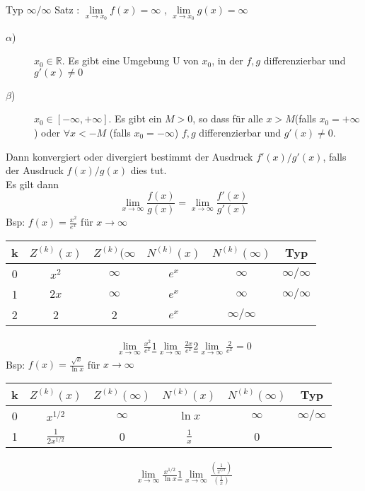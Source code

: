 \documentclass{article}
\begin{document}
Typ \(\infty / \infty\) \medskip
Satz :  \(\lim\limits_{x \to x_0} f(x) = \infty\) , \(\lim\limits_{x \to x_0} g(x) = \infty\)\medskip
\begin{description}
\item[\(\alpha\))]
\(x_0 \in \mathbb{R}\). Es gibt eine Umgebung U von \(x_0\), in der \(f,g\) differenzierbar und \(g'(x) \neq 0\)\medskip
\item[\(\beta\))]
\(x_0 \in [-\infty, +\infty]\). Es gibt ein \(M > 0\), so dass für alle \(x > M\)(falls \(x_0 = +\infty\)) oder \(\forall x < - M\) (falls \(x_0 = -\infty\)) \(f,g\) differenzierbar und \(g'(x) \neq 0\).\medskip
\end{description}
Dann konvergiert oder divergiert bestimmt der Ausdruck \(f'(x)/g'(x)\), falls der Ausdruck \(f(x)/g(x)\) dies tut.\\
Es gilt dann \[\lim\limits_{x \to \infty}\frac{f(x)}{g(x)} = \lim\limits_{x \to \infty}\frac{f'(x)}{g'(x)}\]
\medskip
Bsp: \(f(x) = \frac{x^2}{e^x}\) für \(x \to \infty\)
\begin{table}[h!]
	\centering
	\begin{tabular}{c|c|c|c|c|c}
	k & \(Z^{(k)}(x)\) & \(Z^{(k)}(\infty\) & \(N^{(k)}(x)\) & \(N^{(k)}(\infty)\) & Typ\\
	\hline
	0 & \(x^2\) & \(\infty\) & \(e^x\) & \(\infty\) & \(\infty / \infty\)\\
	1 & \(2x\) & \(\infty\) & \(e^x\) & \(\infty\) & \(\infty / \infty\)\\
	2 & 2 & 2 & \(e^x\) & \(\infty / \infty\)
	\end{tabular}

\end{table}

\begin{align*}
\lim\limits_{x \to \infty}\frac{x^2}{e^x} \underset{=}{1} \lim\limits_{x \to \infty}\frac{2x}{e^x} \underset{=}{2} \lim\limits_{x \to \infty}\frac{2}{e^x} = 0
\end{align*}
\newpage
Bsp: \(f(x) = \frac{\sqrt{x}}{\ln x}\) für \(x \to \infty\)

\begin{table}[h!]
	\centering
	\begin{tabular}{c|c|c|c|c|c}
		k & \(Z^{(k)}(x)\) & \(Z^{(k)}(\infty)\) & \(N^{(k)}(x)\) & \(N^{(k)}(\infty)\) & Typ\\
		\hline
		0 & \(x^{1/2}\) & \(\infty\) & \(\ln x\) & \(\infty\) & \(\infty / \infty\)\\
		1 & \(\frac{1}{2x^{1/2}}\) & 0 & \(\frac{1}{x}\) & 0\\
	\end{tabular}

\end{table}
\begin{align*}
\lim\limits_{x \to \infty} \frac{x^{1/2}}{\ln x} \underset{=}{1} \lim\limits_{x \to \infty} \frac{(\frac{1}{2^{1/2}})}{(\frac{1}{x})}
\end{align*}
\end{document}
